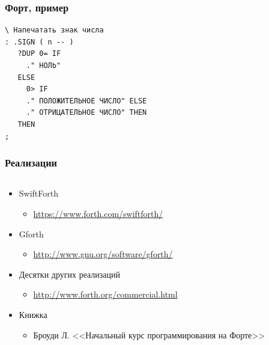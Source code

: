 \documentclass[xetex,mathserif,serif]{beamer}
\begin{document}
	\begin{frame}[fragile]
		\frametitle{Форт, пример}
		\begin{verbatim}
\ Напечатать знак числа
: .SIGN ( n -- )
   ?DUP 0= IF
     ." НОЛЬ"
   ELSE
     0> IF
     ." ПОЛОЖИТЕЛЬНОЕ ЧИСЛО" ELSE
     ." ОТРИЦАТЕЛЬНОЕ ЧИСЛО" THEN
   THEN
;
		\end{verbatim}
	\end{frame}

	\begin{frame}
		\frametitle{Реализации}
		\begin{columns}
			\begin{column}{0.8\textwidth}
				\begin{itemize}
					\item SwiftForth
					\begin{itemize}
						\item \url{https://www.forth.com/swiftforth/}
					\end{itemize}
					\item Gforth
					\begin{itemize}
						\item \url{http://www.gnu.org/software/gforth/}
					\end{itemize}
					\item Десятки других реализаций
					\begin{itemize}
						\item \url{http://www.forth.org/commercial.html}
					\end{itemize}
					\item Книжка
					\begin{itemize}
						\item Броуди Л. <<Начальный курс программирования на Форте>>
					\end{itemize}
				\end{itemize}
			\end{column}
			\begin{column}{0.2\textwidth}
				\begin{center}

\end{center}
\end{column}
\end{columns}
\end{frame}
\end{document}

